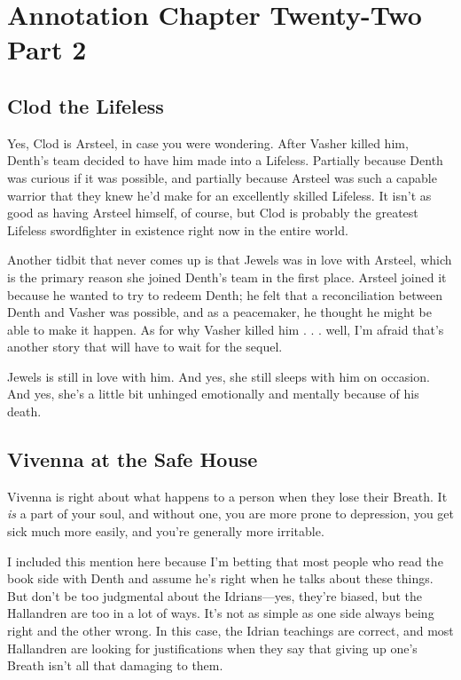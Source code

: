 \section{Annotation Chapter Twenty-Two Part 2}

\subsection*{Clod the Lifeless}

Yes, Clod is Arsteel, in case you were wondering. After Vasher killed him, Denth’s team decided to have him made into a Lifeless. Partially because Denth was curious if it was possible, and partially because Arsteel was such a capable warrior that they knew he’d make for an excellently skilled Lifeless. It isn’t as good as having Arsteel himself, of course, but Clod is probably the greatest Lifeless swordfighter in existence right now in the entire world.

Another tidbit that never comes up is that Jewels was in love with Arsteel, which is the primary reason she joined Denth’s team in the first place. Arsteel joined it because he wanted to try to redeem Denth; he felt that a reconciliation between Denth and Vasher was possible, and as a peacemaker, he thought he might be able to make it happen. As for why Vasher killed him . . . well, I’m afraid that’s another story that will have to wait for the sequel.

Jewels is still in love with him. And yes, she still sleeps with him on occasion. And yes, she’s a little bit unhinged emotionally and mentally because of his death.

\subsection*{Vivenna at the Safe House}

Vivenna is right about what happens to a person when they lose their Breath. It \textit{is} a part of your soul, and without one, you are more prone to depression, you get sick much more easily, and you’re generally more irritable.

I included this mention here because I’m betting that most people who read the book side with Denth and assume he’s right when he talks about these things. But don’t be too judgmental about the Idrians—yes, they’re biased, but the Hallandren are too in a lot of ways. It’s not as simple as one side always being right and the other wrong. In this case, the Idrian teachings are correct, and most Hallandren are looking for justifications when they say that giving up one’s Breath isn’t all that damaging to them.



